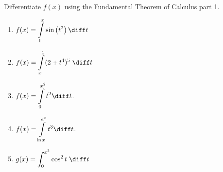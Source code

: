 Differentiate $f(x)$ using the Fundamental Theorem of Calculus part 1.
\begin{multicols}{2}
\begin{enumerate}[ref={\fcProblemRef}]
\item $\displaystyle f(x) = \int\limits_1^x \sin \left(t^2\right)  \diff t$

\item\label{problemDifferentiateFTC1int_x^1(2+t^4)^5dt}  ${\displaystyle f(x) = \int\limits_x^1 (2+t^4)^5 \; \diff t}$


\item  $\displaystyle f(x)=\int\limits_{0}^{x^2} t^2\diff t $.

\item \label{problemd/dx(int_(ln x)^(e^x)t^3dt)} $\displaystyle f(x)=\int\limits_{\ln x}^{e^x} t^3\diff t $.


\item ${\displaystyle g(x) = \int_{0}^{x^3} \cos^2 t \; \diff t}$


\end{enumerate}
\end{multicols}